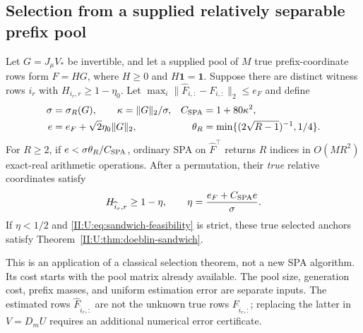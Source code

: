 \subsection{Selection from a supplied relatively separable prefix pool}
\label{II:U:sec:relative-spa}
\begin{theorem}
\label{II:U:thm:relative-spa}
Let $G=J_\mu V_*$ be invertible, and let a supplied pool of $M$ true
prefix-coordinate rows form $F=HG$, where $H\ge0$ and
$H\mathbf1=\mathbf1$. Suppose there are distinct witness rows $i_r$
with $H_{i_r,r}\ge1-\eta_0$. Let
$\max_i\|\widehat F_{i,:}-F_{i,:}\|_2\le e_F$ and define
\begin{align*}
 \sigma&=\sigma_R(G),\qquad \kappa=\|G\|_2/\sigma,
 & C_{\rm SPA}&=1+80\kappa^2,\\
 e&=e_F+\sqrt2\eta_0\|G\|_2,
 & \theta_R&=\min\{(2\sqrt{R-1})^{-1},1/4\}.
\end{align*}
For $R\ge2$, if $e<\sigma\theta_R/C_{\rm SPA}$, ordinary SPA on
$\widehat F^\top$ returns $R$ indices in $O(MR^2)$ exact-real arithmetic
operations. After a permutation, their \emph{true} relative coordinates
satisfy
\begin{equation}
 H_{\widehat i_r,r}\ge1-\eta,\qquad
 \eta=\frac{e_F+C_{\rm SPA}e}{\sigma}.
 \label{II:U:eq:spa-relative-budget}
\end{equation}
If $\eta<1/2$ and \eqref{II:U:eq:sandwich-feasibility} is strict, these true
selected anchors satisfy Theorem~\ref{II:U:thm:doeblin-sandwich}.
\end{theorem}

This is an application of a classical selection theorem, not a new SPA
algorithm. Its cost starts with the pool matrix already available.
The pool size, generation cost, prefix masses, and uniform estimation
error are separate inputs. The estimated rows $\widehat F_{\widehat i_r,:}$
are not the unknown true rows $F_{\widehat i_r,:}$; replacing the latter
in $V=D_mU$ requires an additional numerical error certificate.

